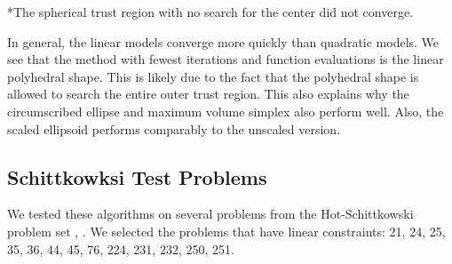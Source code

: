 \begin{center}
\begin{longtable}{ c c c c c c c c }

\end{longtable}
\end{center}
\normalsize

*The spherical trust region with no search for the center did not converge.

In general, the linear models converge more quickly than quadratic models.
We see that the method with fewest iterations and function evaluations is the linear polyhedral shape.
This is likely due to the fact that the polyhedral shape is allowed to search the entire outer trust region.
This also explains why the circumscribed ellipse and maximum volume simplex also perform well.
Also, the scaled ellipsoid performs comparably to the unscaled version.

\subsection{Schittkowksi Test Problems}


We tested these algorithms on several problems from the Hot-Schittkowski problem set \cite{Schittkowski:1987:MTE:27135}, \cite{Hock1980}.
We selected the problems that have linear constraints: 21, 24, 25, 35, 36, 44, 45, 76, 224, 231, 232, 250, 251.


